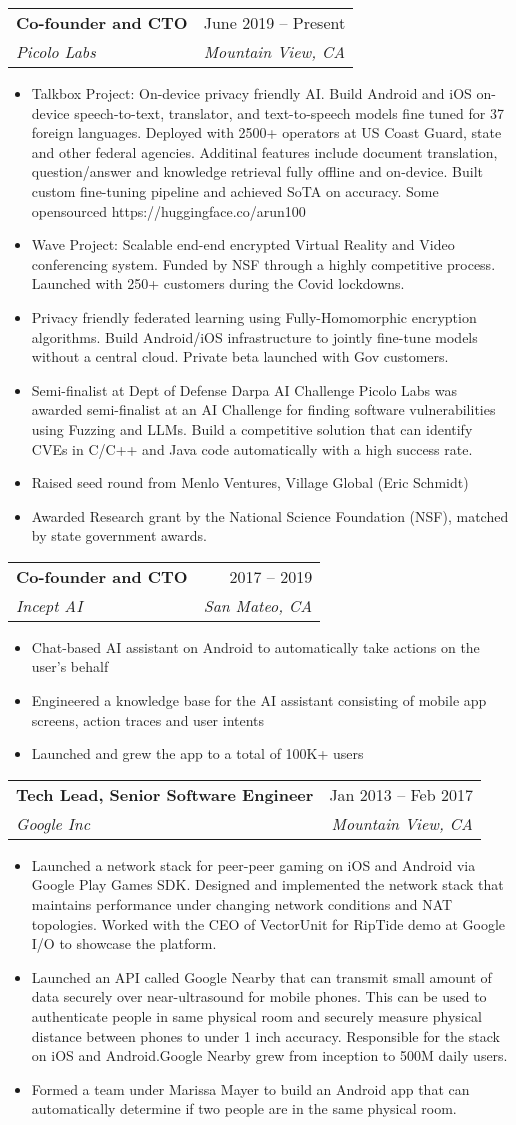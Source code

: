 \documentclass[letterpaper,10pt]{article}
\makeatletter
\newcommand{\resumeItem}[1]{
  \item\small{
    {#1 \vspace{-2pt}}
  }
}
\newcommand{\resumeSubheading}[4]{
  \vspace{-2pt}\item
    \begin{tabular*}{0.97\textwidth}[t]{l@{\extracolsep{\fill}}r}
      \textbf{#1} & #2 \\
      \textit{\small#3} & \textit{\small #4} \\
    \end{tabular*}\vspace{-7pt}
}
\newcommand{\resumeItemListStart}{\begin{itemize}}
\newcommand{\resumeItemListEnd}{\end{itemize}\vspace{-5pt}}
\makeatother
\begin{document}
    \resumeSubheading
      {Co-founder and CTO}{June 2019 -- Present}
      {Picolo Labs}{Mountain View, CA}
      \resumeItemListStart
        \resumeItem{Talkbox Project: On-device privacy friendly AI. Build Android and iOS on-device speech-to-text, translator, and text-to-speech models fine tuned for 37 foreign languages.
        Deployed with 2500+ operators at US Coast Guard, state and other federal agencies. Additinal features include document translation, question/answer and knowledge retrieval fully offline and on-device. Built custom fine-tuning pipeline and achieved SoTA on accuracy. Some opensourced https://huggingface.co/arun100}
        \resumeItem{Wave Project: Scalable end-end encrypted Virtual Reality and Video conferencing system. Funded by NSF through a highly competitive process. Launched with 250+ customers during the Covid lockdowns.}
        \resumeItem{Privacy friendly federated learning using Fully-Homomorphic encryption algorithms. Build Android/iOS infrastructure to jointly fine-tune models without a central cloud. Private beta launched with Gov customers.}
        \resumeItem{Semi-finalist at Dept of Defense Darpa AI Challenge}{Picolo Labs was awarded semi-finalist at an AI Challenge for finding software vulnerabilities using Fuzzing and LLMs. Build a competitive solution that can identify CVEs in C/C++ and Java code automatically with a high success rate.}
        \resumeItem{Raised seed round from Menlo Ventures, Village Global (Eric Schmidt)}
        \resumeItem{Awarded Research grant by the National Science Foundation (NSF), matched by state government awards.}
      \resumeItemListEnd
      
    \resumeSubheading
      {Co-founder and CTO}{2017 -- 2019}
      {Incept AI}{San Mateo, CA}
      \resumeItemListStart
        \resumeItem{Chat-based AI assistant on Android to automatically take actions on the user's behalf}
        \resumeItem{Engineered a knowledge base for the AI assistant consisting of mobile app screens, action traces and user intents}
        \resumeItem{Launched and grew the app to a total of 100K+ users}
    \resumeItemListEnd

    \resumeSubheading
      {Tech Lead, Senior Software Engineer}{Jan 2013 -- Feb 2017}
      {Google Inc}{Mountain View, CA}
      \resumeItemListStart
        \resumeItem{Launched a network stack for peer-peer gaming on iOS and Android via Google Play Games SDK. Designed and implemented the network stack that maintains performance under changing network conditions and NAT topologies. Worked with the CEO of VectorUnit for RipTide
        demo at Google I/O to showcase the platform.}
        \resumeItem{Launched an API called Google Nearby that can transmit small amount of data securely over near-ultrasound for mobile phones. This can
        be used to authenticate people in same physical room and securely measure physical distance
        between phones to under 1 inch accuracy. Responsible for the stack on iOS and Android.Google Nearby grew from inception to 500M daily users.}
        \resumeItem{Formed a team under Marissa Mayer to build an Android app that can automatically determine if two people are in the same physical room.}
      \resumeItemListEnd
\end{document}
